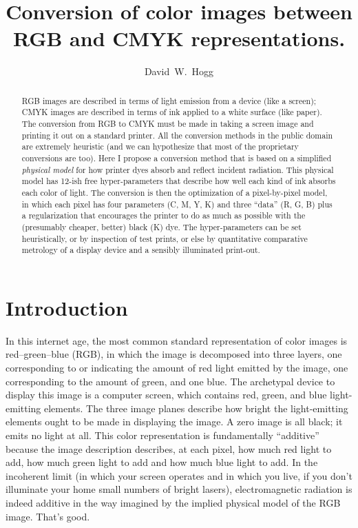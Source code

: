 \documentclass[letterpaper,preprint,dvipdf]{aastex}
\newcounter{address}
\begin{document}
\title{
  Conversion of color images between RGB and CMYK representations.
}
\author{
  David~W.~Hogg\altaffilmark{\ref{NYU},\ref{email}}
}

\setcounter{address}{1}

\begin{abstract}
RGB images are described in terms of light emission from a device
(like a screen); CMYK images are described in terms of ink applied to
a white surface (like paper).  The conversion from RGB to CMYK must be
made in taking a screen image and printing it out on a standard
printer.  All the conversion methods in the public domain are
extremely heuristic (and we can hypothesize that most of the
proprietary conversions are too).  Here I propose a conversion method
that is based on a simplified \emph{physical model} for how printer
dyes absorb and reflect incident radiation.  This physical model has
12-ish free hyper-parameters that describe how well each kind of ink
absorbs each color of light.  The conversion is then the optimization
of a pixel-by-pixel model, in which each pixel has four parameters (C,
M, Y, K) and three ``data'' (R, G, B) plus a regularization that
encourages the printer to do as much as possible with the (presumably
cheaper, better) black (K) dye.  The hyper-parameters can be set
heuristically, or by inspection of test prints, or else by
quantitative comparative metrology of a display device and a sensibly
illuminated print-out.
\end{abstract}

\section{Introduction}

In this internet age, the most common standard representation of color
images is red--green--blue (RGB), in which the image is decomposed
into three layers, one corresponding to or indicating the amount of
red light emitted by the image, one corresponding to the amount of
green, and one blue.  The archetypal device to display this image is a
computer screen, which contains red, green, and blue light-emitting
elements.  The three image planes describe how bright the
light-emitting elements ought to be made in displaying the image.  A
zero image is all black; it emits no light at all.  This color
representation is fundamentally ``additive'' because the image
description describes, at each pixel, how much red light to add, how
much green light to add and how much blue light to add.  In the
incoherent limit (in which your screen operates and in which you live,
if you don't illuminate your home small numbers of bright lasers),
electromagnetic radiation is indeed additive in the way imagined by
the implied physical model of the RGB image.  That's good.
\end{document}
